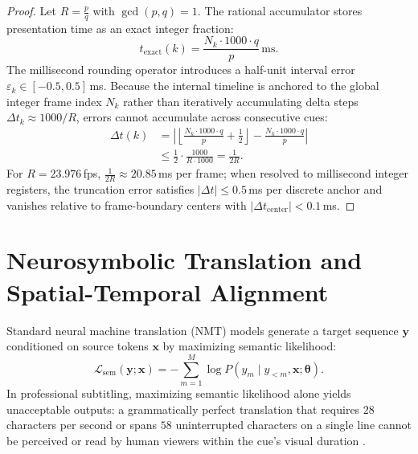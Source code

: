 \documentclass[11pt,a4paper,reqno]{article}
\theoremstyle{definition}
\theoremstyle{remark}
\begin{document}
\begin{proof}
Let $R = \frac{p}{q}$ with $\gcd(p, q) = 1$. The rational accumulator stores presentation time as an exact integer fraction:
\begin{equation}
t_{\text{exact}}(k) = \frac{N_k \cdot 1000 \cdot q}{p}\,\mathrm{ms}.
\end{equation}
The millisecond rounding operator introduces a half-unit interval error $\varepsilon_k \in [-0.5, 0.5]$\,ms. Because the internal timeline is anchored to the global integer frame index $N_k$ rather than iteratively accumulating delta steps $\Delta t_k \approx 1000/R$, errors cannot accumulate across consecutive cues:
\begin{equation}
\begin{aligned}
\Delta t(k) &= \left| \left\lfloor \frac{N_k \cdot 1000 \cdot q}{p} + \frac{1}{2} \right\rfloor - \frac{N_k \cdot 1000 \cdot q}{p} \right| \\
&\le \frac{1}{2} \cdot \frac{1000}{R \cdot 1000} = \frac{1}{2R}.
\end{aligned}
\end{equation}
For $R = 23.976$\,fps, $\frac{1}{2R} \approx 20.85$\,ms per frame; when resolved to millisecond integer registers, the truncation error satisfies $|\Delta t| \le 0.5$\,ms per discrete anchor and vanishes relative to frame-boundary centers with $|\Delta t_{\text{center}}| < 0.1$\,ms.
\end{proof}

\section{Neurosymbolic Translation and Spatial-Temporal Alignment}
\label{sec:neurosymbolic}

Standard neural machine translation (NMT) models generate a target sequence $\mathbf{y}$ conditioned on source tokens $\mathbf{x}$ by maximizing semantic likelihood:
\begin{equation}
\mathcal{L}_{\text{sem}}(\mathbf{y}; \mathbf{x}) = -\sum_{m=1}^M \log P(y_m \mid y_{<m}, \mathbf{x}; \boldsymbol{\theta}).
\end{equation}
In professional subtitling, maximizing semantic likelihood alone yields unacceptable outputs: a grammatically perfect translation that requires $28$ characters per second or spans $58$ uninterrupted characters on a single line cannot be perceived or read by human viewers within the cue's visual duration \cite{netflix_style_guide}.
\end{document}
